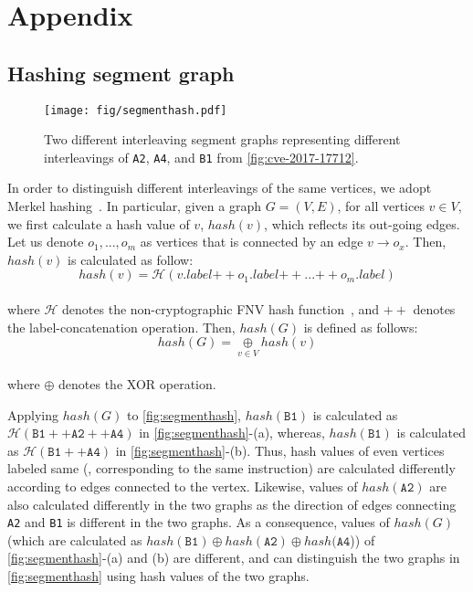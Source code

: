 \section{Appendix}


\subsection{Hashing segment graph}
\label{s:appendix:hash}

\begin{figure}[h]
  \centering
  \texttt{[image: fig/segmenthash.pdf]}
  \caption{Two different interleaving segment graphs representing
    different interleavings of \texttt{A2}, \texttt{A4}, and
    \texttt{B1} from \autoref{fig:cve-2017-17712}.}
  \label{fig:segmenthash}
\end{figure}
%

In order to distinguish different interleavings of the same vertices,
we adopt Merkel hashing~\cite{treehashing, treehashing2}.
%
In particular, given a graph $G = (V, E)$, for all vertices $v \in V$,
we first calculate a hash value of $v$, $hash(v)$, which reflects its
out-going edges.
%
Let us denote $o_1, ..., o_m$ as vertices that is connected by an edge
$v \rightarrow o_x$. Then, $hash(v)$ is calculated as follow:
%
%
\\
\[
  hash(v) = \mathcal{H}(v.label {++} o_1.label {++} ... {++}
  o_m.label)
\]
\\
%
where $\mathcal{H}$ denotes the non-cryptographic FNV hash
function~\cite{fnv, fnv-go}, and ${++}$ denotes the
label-concatenation operation.
%
Then, $hash(G)$ is defined as follows:
%
\\[1pt]
\[
  hash(G) = \underset{v \in V}{\oplus} hash(v)
\]
\\[1pt]
%
where $\oplus$ denotes the XOR operation.

Applying $hash(G)$ to \autoref{fig:segmenthash}, $hash(\texttt{B1})$
is calculated as
$\mathcal{H}(\texttt{B1} ++ \texttt{A2} ++ \texttt{A4})$ in
\autoref{fig:segmenthash}-(a), whereas, $hash(\texttt{B1})$ is
calculated as $\mathcal{H}(\texttt{B1} ++ \texttt{A4})$ in
\autoref{fig:segmenthash}-(b).
%
Thus, hash values of even vertices labeled same (\ie, corresponding to
the same instruction) are calculated differently according to edges
connected to the vertex.
%
Likewise, values of $hash(\texttt{A2})$ are also calculated
differently in the two graphs as the direction of edges connecting
\texttt{A2} and \texttt{B1} is different in the two graphs.
%
As a consequence, values of $hash(G)$ (which are calculated as
$hash(\texttt{B1}) \oplus hash(\texttt{A2}) \oplus hash(\texttt{A4}$))
of \autoref{fig:segmenthash}-(a) and (b) are different, and \sys can
distinguish the two graphs in \autoref{fig:segmenthash} using hash
values of the two graphs.



